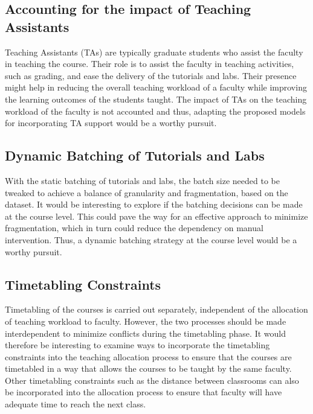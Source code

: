 \subsection{Accounting for the impact of Teaching Assistants}

Teaching Assistants (TAs) are typically graduate students who assist the faculty in teaching the course. Their role is to assist the faculty in teaching activities, such as grading, and ease the delivery of the tutorials and labs. Their presence might help in reducing the overall teaching workload of a faculty while improving the learning outcomes of the students taught. The impact of TAs on the teaching workload of the faculty is not accounted and thus, adapting the proposed models for incorporating TA support would be a worthy pursuit.

\subsection{Dynamic Batching of Tutorials and Labs}

With the static batching of tutorials and labs, the batch size needed to be tweaked to achieve a balance of granularity and fragmentation, based on the dataset. It would be interesting to explore if the batching decisions can be made at the course level. This could pave the way for an effective approach to minimize fragmentation, which in turn could reduce the dependency on manual intervention. Thus, a dynamic batching strategy at the course level would be a worthy pursuit.

\subsection{Timetabling Constraints}

Timetabling of the courses is carried out separately, independent of the allocation of teaching workload to faculty. However, the two processes should be made interdependent to minimize conflicts during the timetabling phase. It would therefore be interesting to examine ways to incorporate the timetabling constraints into the teaching allocation process to ensure that the courses are timetabled in a way that allows the courses to be taught by the same faculty. Other timetabling constraints such as the distance between classrooms can also be incorporated into the allocation process to ensure that faculty will have adequate time to reach the next class.
